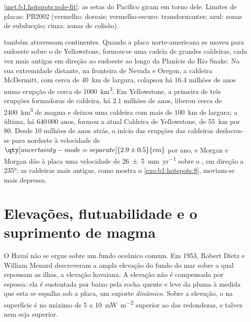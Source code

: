 \begin{omfigure}
{\cref{met:b1:hotspots:pole-fit}: as setas do Pacífico giram em torno dele. Limites de placas: PB2002 (vermelho: dorsais; vermelho-escuro: transformantes; azul: zonas de subducção; cinza: zonas de colisão).}
\label{fig:b1:hotspots:map}
\end{omfigure}


 também atravessam continentes. Quando a placa norte-americana se moveu para sudoeste sobre o  de Yellowstone, formou-se uma cadeia de grandes caldeiras, cada vez mais antigas em direção ao sudoeste ao longo da Planície do Rio Snake. Na sua extremidade distante, na fronteira de Nevada e Oregon, a caldeira McDermitt, com cerca de \qty{40}{km} de largura, colapsou há 16.4 milhões de anos numa erupção de cerca de \qty{1000}{km^3}. Em Yellowstone, a primeira de três erupções formadoras de caldeira, há 2.1 milhões de anos, liberou cerca de \qty{2400}{km^3} de magma e deixou uma caldeira com mais de \qty{100}{km} de largura; a última, há 640\,000 anos, formou a atual Caldeira de Yellowstone, de \qty{55}{km} por 80. Desde 10 milhões de anos atrás, o início das erupções das caldeiras deslocou-se para nordeste à velocidade de $\qty[uncertainty-mode=separate]{2.9 \pm 0.5}{cm}$ por ano, e Morgan e Morgan dão à placa uma velocidade de
\qty[uncertainty-mode=separate]{26 \pm 5}{mm.yr^{-1}} sobre o , em direção a \ang{235}; as caldeiras mais antigas, como mostra o \cref{exo:b1:hotspots:8}, moviam-se mais depressa.

\section{Elevações, flutuabilidade e o suprimento de magma}\label{sec:b1:hotspots:swells}

O Havaí não se ergue sobre um fundo oceânico comum. Em 1953, Robert Dietz e William Menard descreveram a ampla elevação do fundo do mar sobre a qual repousam as ilhas, a elevação havaiana. A elevação não é compensada por  espessa: ela é sustentada por baixo pela rocha quente e leve da pluma à medida que esta se espalha sob a placa, um suporte \emph{dinâmico}. Sobre a elevação, o  na superfície é no máximo de 5 a \qty{10}{mW.m^{-2}} superior ao das redondezas, e talvez nem seja superior.

